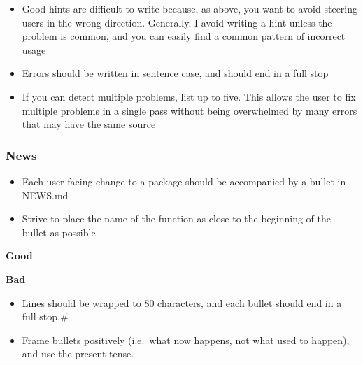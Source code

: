 \documentclass[
]{article}
\newenvironment{Shaded}{\begin{snugshade}}{\end{snugshade}}
\newcommand{\CommentTok}[1]{\textcolor[rgb]{0.56,0.35,0.01}{\textit{#1}}}
\providecommand{\tightlist}{%
  \setlength{\itemsep}{0pt}\setlength{\parskip}{0pt}}
\begin{document}
\begin{itemize}
\tightlist
\item
  Good hints are difficult to write because, as above, you want to avoid
  steering users in the wrong direction. Generally, I avoid writing a
  hint unless the problem is common, and you can easily find a common
  pattern of incorrect usage
\item
  Errors should be written in sentence case, and should end in a full
  stop
\item
  If you can detect multiple problems, list up to five. This allows the
  user to fix multiple problems in a single pass without being
  overwhelmed by many errors that may have the same source
\end{itemize}

\hypertarget{news}{%
\subsubsection{News}\label{news}}

\begin{itemize}
\tightlist
\item
  Each user-facing change to a package should be accompanied by a bullet
  in NEWS.md
\item
  Strive to place the name of the function as close to the beginning of
  the bullet as possible
\end{itemize}

\textbf{Good}

\begin{Shaded}
\end{Shaded}

\textbf{Bad}

\begin{Shaded}
\end{Shaded}

\begin{itemize}
\tightlist
\item
  Lines should be wrapped to 80 characters, and each bullet should end
  in a full stop.\#
\item
  Frame bullets positively (i.e.~what now happens, not what used to
  happen), and use the present tense.
\end{itemize}
\end{document}

